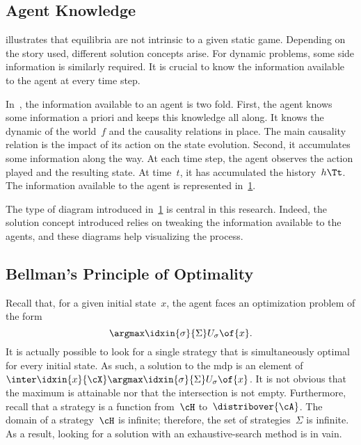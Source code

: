 \subsection{Agent Knowledge}

 illustrates that equilibria are not intrinsic to a given static game.
Depending on the story used, different solution concepts arise.
For dynamic problems, some side information is similarly required.
It is crucial to know the information available to the agent at every time step.

In~, the information available to an agent is two fold.
First, the agent knows some information a priori and keeps this knowledge all along.
It knows the dynamic of the world~\(f\) and the causality relations in place.
The main causality relation is the impact of its action on the state evolution.
Second, it accumulates some information along the way.
At each time step, the agent observes the action played and the resulting state.
At time~\(t\), it has accumulated the history~\(h\Tt\).
The information available to the agent is represented in~\cref{fig:agent_knowledge_mdp}.

\begin{figure}[htp]
\centering
{}
\label{fig:agent_knowledge_mdp}
\end{figure}

The type of diagram introduced in~\cref{fig:agent_knowledge_mdp} is central in this research.
Indeed, the solution concept introduced relies on tweaking the information available to the agents, and these diagrams help visualizing the process.

\subsection{Bellman's Principle of Optimality}

Recall that, for a given initial state~\(x\), the agent faces an optimization problem of the form
\[
\argmax\idxin{\sigma}{\Sigma} U\strat{\sigma} \of{x}.
\]
It is actually possible to look for a single strategy that is simultaneously optimal for every initial state.
As such, a solution to the \ac{mdp} is an element of~\(\inter \idxin {x} {\cX} \argmax \idxin {\sigma} {\Sigma} U \strat{\sigma} \of {x}\).
It is not obvious that the maximum is attainable nor that the intersection is not empty.
Furthermore, recall that a strategy is a function from~\(\cH\) to~\(\distribover{\cA}\).
The domain of a strategy~\(\cH\) is infinite; therefore, the set of strategies~\(\Sigma\) is infinite.
As a result, looking for a solution with an exhaustive-search method is in vain.

